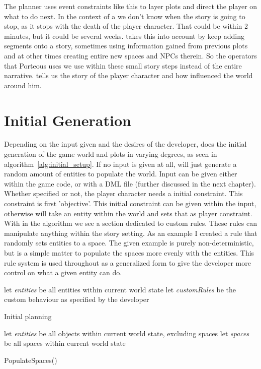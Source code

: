 The \diage planner uses event constraints like this to layer plots and direct the player on what to do next. In the context of a \rogue we don't know when the story is going to stop, as it stops with the death of the player character. That could be within 2 minutes, but it could be several weeks. \diage takes this into account by keep adding segments onto a story, sometimes using information gained from previous plots and at other times creating entire new spaces and NPCs therein. So the operators that Porteous uses we use within these small story steps instead of the entire narrative. \diage tells us the story of the player character and how \he influenced the world around him.

\section{Initial Generation}
Depending on the input given and the desires of the developer, \diage does the initial generation of the game world and plots in varying degrees, as seen in algorithm~\ref{alg:initial_setup}. If no input is given at all, \diage will just generate a random amount of entities to populate the world. Input can be given either within the game code, or with a DML file (further discussed in the next chapter). Whether specified or not, the player character needs a initial constraint. This constraint is \his first 'objective'. This initial constraint can be given within the input, otherwise \diage will take an entity within the world and sets that as player constraint. With in the algorithm we see a section dedicated to custom rules. These rules can manipulate anything within the story setting. As an example I created a rule that randomly sets entities to a space. The given example is purely non-deterministic, but is a simple matter to populate the spaces more evenly with the entities. This rule system is used throughout \diage as a generalized form to give the developer more control on what a given entity can do.

\begin{algorithm}
	let \textit{entities} be all entities within current world state\;
	let \textit{customRules} be the custom behaviour as specified by the developer\;
    \caption{Initial planning}\label{alg:initial_setup}
\end{algorithm}
\begin{procedure}
	let \textit{entities} be all objects within current world state, excluding spaces\;
	let \textit{spaces} be all spaces within current world state\;
	\caption{PopulateSpaces()}\label{proc:rule_example}
\end{procedure}

